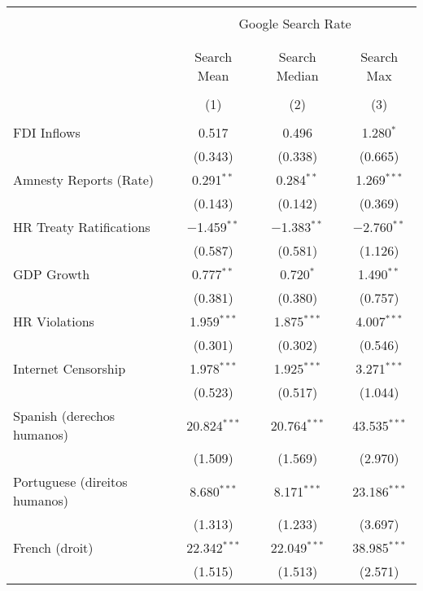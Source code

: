 
\begin{table}[!htbp] \centering 
  \caption{} 
  \label{} 
\begin{tabular}{@{\extracolsep{5pt}}lccc} 
\\[-1.8ex]\hline 
\hline \\[-1.8ex] 
 & \multicolumn{3}{c}{Google Search Rate} \\ 
\cline{2-4} 
\\[-1.8ex] & \multicolumn{3}{c}{ } \\ 
 & Search Mean & Search Median & Search Max \\ 
\\[-1.8ex] & (1) & (2) & (3)\\ 
\hline \\[-1.8ex] 
 FDI Inflows & 0.517 & 0.496 & 1.280$^{*}$ \\ 
  & (0.343) & (0.338) & (0.665) \\ 
  Amnesty Reports (Rate) & 0.291$^{**}$ & 0.284$^{**}$ & 1.269$^{***}$ \\ 
  & (0.143) & (0.142) & (0.369) \\ 
  HR Treaty Ratifications & $-$1.459$^{**}$ & $-$1.383$^{**}$ & $-$2.760$^{**}$ \\ 
  & (0.587) & (0.581) & (1.126) \\ 
  GDP Growth & 0.777$^{**}$ & 0.720$^{*}$ & 1.490$^{**}$ \\ 
  & (0.381) & (0.380) & (0.757) \\ 
  HR Violations & 1.959$^{***}$ & 1.875$^{***}$ & 4.007$^{***}$ \\ 
  & (0.301) & (0.302) & (0.546) \\ 
  Internet Censorship & 1.978$^{***}$ & 1.925$^{***}$ & 3.271$^{***}$ \\ 
  & (0.523) & (0.517) & (1.044) \\ 
  Spanish (derechos humanos) & 20.824$^{***}$ & 20.764$^{***}$ & 43.535$^{***}$ \\ 
  & (1.509) & (1.569) & (2.970) \\ 
  Portuguese (direitos humanos) & 8.680$^{***}$ & 8.171$^{***}$ & 23.186$^{***}$ \\ 
  & (1.313) & (1.233) & (3.697) \\ 
  French (droit) & 22.342$^{***}$ & 22.049$^{***}$ & 38.985$^{***}$ \\ 
  & (1.515) & (1.513) & (2.571) \\ 

\end{tabular}
\end{table}
